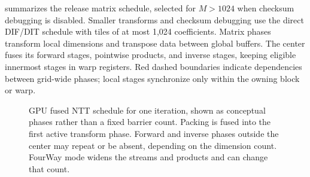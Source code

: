  summarizes the release matrix schedule, selected for
$M>1024$ when checksum debugging is disabled.  Smaller transforms and checksum
debugging use the direct DIF/DIT schedule with tiles of at most 1,024
coefficients.  Matrix phases transform local dimensions and transpose data
between global buffers.  The center fuses its forward stages, pointwise
products, and inverse stages, keeping eligible innermost stages in warp
registers.  Red dashed boundaries indicate dependencies between grid-wide
phases; local stages synchronize only within the owning block or warp.

\begin{figure}[!htbp]
\centering
{}
\caption[GPU fused NTT schedule and synchronization hierarchy]{GPU fused NTT schedule for one
  iteration, shown as conceptual phases rather than a fixed barrier count.
  Packing is fused into the first active transform phase.  Forward and inverse
  phases outside the center may repeat or be absent, depending on the dimension
  count.  FourWay mode widens the streams and products and can change that count.}
\label{fig:ntt-pipeline}
\end{figure}

